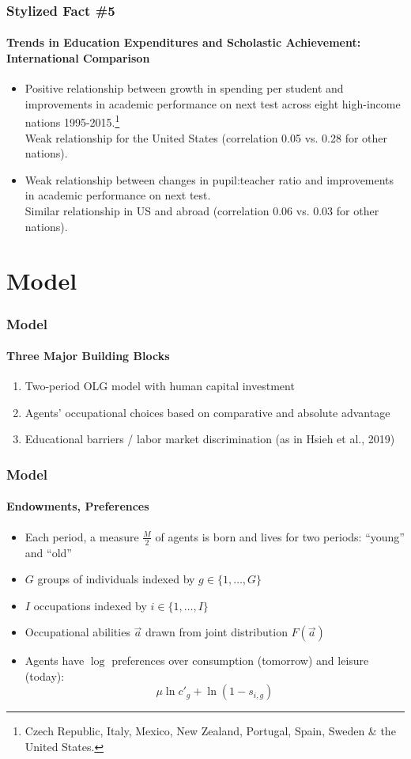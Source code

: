 \documentclass[11pt,hyperref={bookmarks=false},table,aspectratio=169]{beamer}
\begin{document}
\begin{frame}
	\frametitle{Stylized Fact \#5}
		\framesubtitle{Trends in Education Expenditures and Scholastic Achievement: International Comparison}
	\begin{itemize}
		\item Positive relationship between growth in spending per student and improvements in academic performance on next test across eight high-income nations 1995-2015.\footnote{Czech Republic, Italy, Mexico, New Zealand, Portugal, Spain, Sweden \& the United States.}\\
\alert{Weak relationship for the United States (correlation 0.05 vs. 0.28 for other nations).}
		\item Weak relationship between changes in pupil:teacher ratio and improvements in academic performance on next test.\\ 
\alert{Similar relationship in US and abroad (correlation 0.06 vs. 0.03 for other nations).}
	\end{itemize}
\end{frame}	

\section{Model}	

\begin{frame}
		\frametitle{Model}
		\framesubtitle{Three Major Building Blocks}
		\begin{enumerate}
			\item Two-period OLG model with human capital investment
			\item Agents' occupational choices based on comparative and absolute advantage
			\item Educational barriers / labor market discrimination (as in Hsieh et al., 2019)
		\end{enumerate}
	\end{frame}
	
	\begin{frame}
		\frametitle{Model}
		\framesubtitle{Endowments, Preferences}
		\begin{itemize}
			\item Each period, a measure $\tfrac{M}{2}$ of agents is born and lives for two periods: ``young'' and ``old''
			\item $G$ groups of individuals indexed by $g \in \{1,\dots,G\}$
            \item $I$ occupations indexed by $i \in \{1,\dots,I\}$
			\item Occupational abilities $\vec{a}$ drawn from joint distribution $F(\vec{a})$
			\item Agents have $\log$ preferences over consumption (tomorrow) and leisure (today):
			\begin{displaymath}
				\mu \ln c'_{g} + \ln\left(1-s_{i,g} \right)
			\end{displaymath}
		\end{itemize}
	\end{frame}
	
\end{document}
